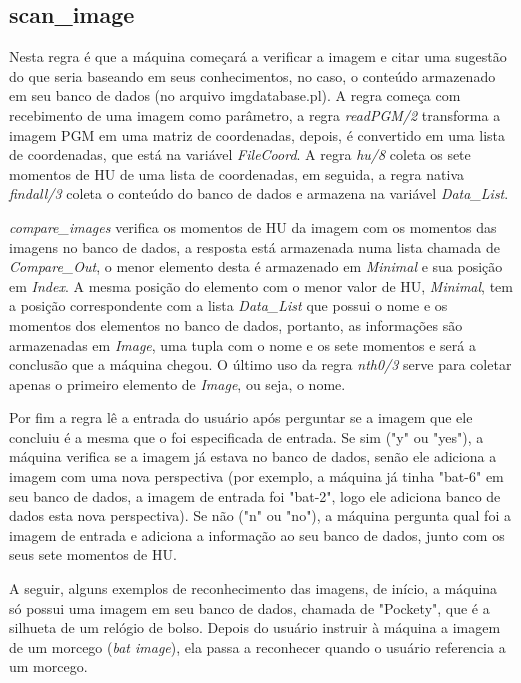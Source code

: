 \documentclass{article}
\begin{document}
    \subsection*{scan\_image}
        Nesta regra é que a máquina começará a verificar a imagem e citar uma
        sugestão do que seria baseando em seus conhecimentos, no caso, o
        conteúdo armazenado em seu banco de dados (no arquivo imgdatabase.pl).
        A regra começa com recebimento de uma imagem como parâmetro, a regra
        \textit{readPGM/2} transforma a imagem PGM em uma matriz de
        coordenadas, depois, é convertido em uma lista de coordenadas, que está
        na variável \textit{FileCoord}. A regra \textit{hu/8} coleta os sete
        momentos de HU de uma lista de coordenadas, em seguida, a regra nativa
        \textit{findall/3} coleta o conteúdo do banco de dados e armazena na
        variável \textit{Data\_List}.
        
        \textit{compare\_images} verifica os momentos de HU da imagem com os
        momentos das imagens no banco de dados, a resposta está armazenada numa
        lista chamada de \textit{Compare\_Out}, o menor elemento desta é
        armazenado em \textit{Minimal} e sua posição em \textit{Index}. A mesma
        posição do elemento com o menor valor de HU, \textit{Minimal}, tem a
        posição correspondente com a lista \textit{Data\_List} que possui o
        nome e os momentos dos elementos no banco de dados, portanto, as
        informações são armazenadas em \textit{Image}, uma tupla com o nome e
        os sete momentos e será a conclusão que a máquina chegou. O último uso
        da regra \textit{nth0/3} serve para coletar apenas o primeiro elemento
        de \textit{Image}, ou seja, o nome.
        
        Por fim a regra lê a entrada do usuário após perguntar se a imagem que
        ele concluiu é a mesma que o foi especificada de entrada. Se sim ("y"
        ou "yes"), a máquina verifica se a imagem já estava no banco de dados,
        senão ele adiciona a imagem com uma nova perspectiva (por exemplo, a
        máquina já tinha "bat-6" em seu banco de dados, a imagem de entrada foi
        "bat-2", logo ele adiciona banco de dados esta nova perspectiva). Se
        não ("n" ou "no"), a máquina pergunta qual foi a imagem de entrada e
        adiciona a informação ao seu banco de dados, junto com os seus sete
        momentos de HU.
        
        A seguir, alguns exemplos de reconhecimento das imagens, de início, a
        máquina só possui uma imagem em seu banco de dados, chamada de
        "Pockety", que é a silhueta de um relógio de bolso. Depois do usuário
        instruir à máquina a imagem de um morcego (\textit{bat image}), ela
        passa a reconhecer quando o usuário referencia a um morcego.
        
\end{document}
